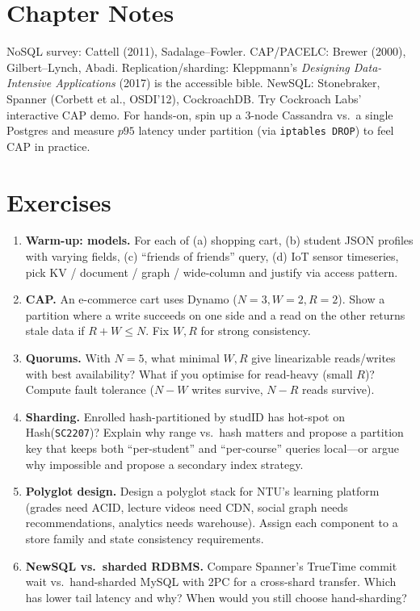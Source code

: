 \section{Chapter Notes}

NoSQL survey: Cattell (2011), Sadalage--Fowler. CAP/PACELC: Brewer (2000), Gilbert--Lynch, Abadi. Replication/sharding: Kleppmann's \emph{Designing Data-Intensive Applications} (2017) is the accessible bible. NewSQL: Stonebraker, Spanner (Corbett et al., OSDI'12), CockroachDB. Try Cockroach Labs' interactive CAP demo. For hands-on, spin up a 3-node Cassandra vs.\ a single Postgres and measure $p95$ latency under partition (via \texttt{iptables DROP}) to feel CAP in practice.

\section{Exercises}
\label{sec:ch08-ex}
\begin{enumerate}[label=E8.\arabic*, leftmargin=*, itemsep=0.75em]
    \item \textbf{Warm-up: models.} For each of (a) shopping cart, (b) student JSON profiles with varying fields, (c) ``friends of friends'' query, (d) IoT sensor timeseries, pick KV / document / graph / wide-column and justify via access pattern.
    \item \textbf{CAP.} An e-commerce cart uses Dynamo ($N=3,W=2,R=2$). Show a partition where a write succeeds on one side and a read on the other returns stale data if $R+W\le N$. Fix $W,R$ for strong consistency.
    \item \textbf{Quorums.} With $N=5$, what minimal $W,R$ give linearizable reads/writes with best availability? What if you optimise for read-heavy (small $R$)? Compute fault tolerance ($N-W$ writes survive, $N-R$ reads survive).
    \item \textbf{Sharding.} Enrolled hash-partitioned by studID has hot-spot on Hash(\texttt{SC2207})? Explain why range vs.\ hash matters and propose a partition key that keeps both ``per-student'' and ``per-course'' queries local---or argue why impossible and propose a secondary index strategy.
    \item \textbf{Polyglot design.} Design a polyglot stack for NTU's learning platform (grades need ACID, lecture videos need CDN, social graph needs recommendations, analytics needs warehouse). Assign each component to a store family and state consistency requirements.
    \item \textbf{NewSQL vs.\ sharded RDBMS.} Compare Spanner's TrueTime commit wait vs.\ hand-sharded MySQL with 2PC for a cross-shard transfer. Which has lower tail latency and why? When would you still choose hand-sharding?
\end{enumerate}

\relax %

\relax %

\relax %
